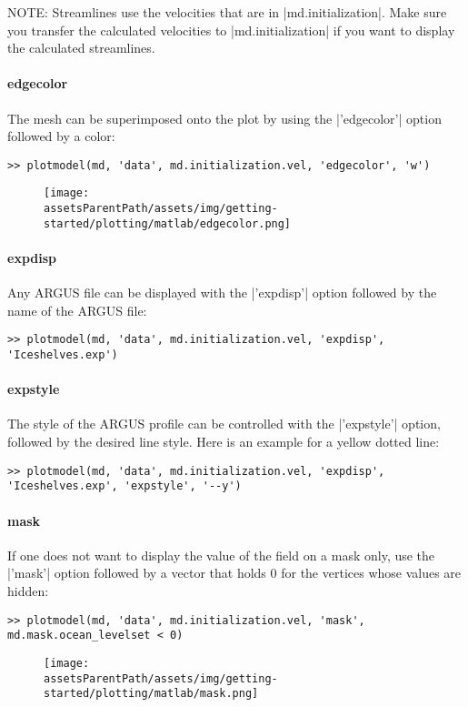 NOTE: Streamlines use the velocities that are in \lstinlinebg|md.initialization|. Make sure you transfer the calculated velocities to \lstinlinebg|md.initialization| if you want to display the calculated streamlines.

\paragraph{edgecolor}
The mesh can be superimposed onto the plot by using the \lstinlinebg|'edgecolor'| option followed by a color:
\begin{lstlisting}
>> plotmodel(md, 'data', md.initialization.vel, 'edgecolor', 'w')
\end{lstlisting}
\begin{figure}[H]
	\begin{center}
		\texttt{[image: \\assetsParentPath/assets/img/getting-started/plotting/matlab/edgecolor.png]}
	\end{center}
\end{figure}

\paragraph{expdisp}
Any ARGUS file can be displayed with the \lstinlinebg|'expdisp'| option followed by the name of the ARGUS file:
\begin{lstlisting}
>> plotmodel(md, 'data', md.initialization.vel, 'expdisp', 'Iceshelves.exp')
\end{lstlisting}

\paragraph{expstyle}
The style of the ARGUS profile can be controlled with the \lstinlinebg|'expstyle'| option, followed by the desired line style. Here is an example for a yellow dotted line:
\begin{lstlisting}
>> plotmodel(md, 'data', md.initialization.vel, 'expdisp', 'Iceshelves.exp', 'expstyle', '--y')
\end{lstlisting}

\paragraph{mask}
If one does not want to display the value of the field on a mask only, use the \lstinlinebg|'mask'| option followed by a vector that holds 0 for the vertices whose values are hidden:
\begin{lstlisting}
>> plotmodel(md, 'data', md.initialization.vel, 'mask', md.mask.ocean_levelset < 0)
\end{lstlisting}
\begin{figure}[H]
	\begin{center}
		\texttt{[image: \\assetsParentPath/assets/img/getting-started/plotting/matlab/mask.png]}
	\end{center}
\end{figure}

